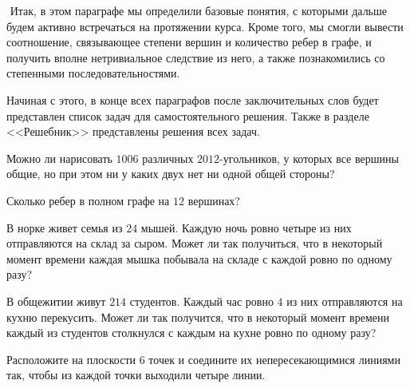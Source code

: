$ $
\newline
	Итак, в этом параграфе мы определили базовые понятия, с которыми дальше будем активно встречаться на протяжении курса. 
	Кроме того, мы смогли вывести соотношение, связывающее степени вершин и количество ребер в графе, 
	и получить вполне нетривиальное следствие из него, а также познакомились со степенными последовательностями.
	
	Начиная с этого, в конце всех параграфов после заключительных слов будет представлен список задач для самостоятельного решения. 
	Также в разделе <<Решебник>> представлены решения всех задач.
		

\begin{exersize}
	Можно ли нарисовать $1006$ различных $2012$-угольников, у которых все вершины общие, но при этом ни у каких двух нет ни одной общей стороны?
\end{exersize}

\begin{exersize}
	Сколько ребер в полном графе на $12$ вершинах?
\end{exersize}

\begin{exersize}
	В норке живет семья из $24$ мышей. Каждую ночь ровно четыре из них отправляются на склад за сыром. 
	Может ли так получиться, что в некоторый момент времени каждая мышка побывала на складе с каждой ровно по одному разу?
\end{exersize}

\begin{exersize}
	В общежитии живут $214$ студентов. Каждый час ровно $4$ из них отправляются на кухню перекусить. 
	Может ли так получится, что в некоторый момент времени каждый из студентов столкнулся с каждым на кухне ровно по одному разу?
\end{exersize}

\begin{exersize}
	Расположите на плоскости 6 точек и соедините их непересекающимися линиями так, чтобы из каждой точки выходили четыре линии.
\end{exersize}

